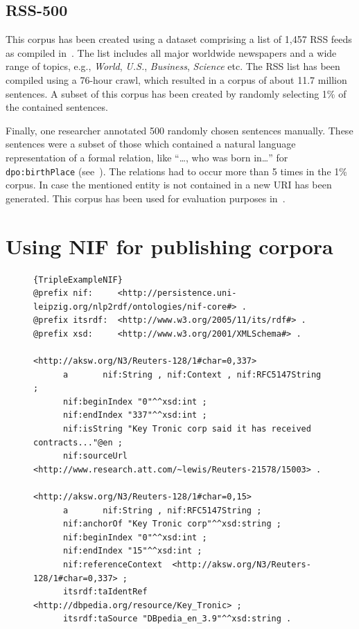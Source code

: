 \documentclass[10pt, a4paper]{article}
\begin{document}
\subsection{RSS-500}

This corpus has been created using a dataset comprising a list of 1,457 RSS feeds as compiled in~\cite{GOLDHAHN12.327}.
The list includes all major worldwide newspapers and a wide range of topics, e.g., \emph{World}, \emph{U.S.}, \emph{Business}, \emph{Science} etc.
The RSS list has been compiled using a 76-hour crawl, which resulted in a corpus of about 11.7 million sentences.
A subset of this corpus has been created by randomly selecting 1\% of the contained sentences.
 
Finally, one researcher annotated 500 randomly chosen sentences manually.
These sentences were a subset of those which contained a natural language representation of a formal relation, like ``\ldots, who was born in\ldots '' for \texttt{dpo:birthPlace} (see~\cite{conf/ekaw/GerberN12}).
The relations had to occur more than 5 times in the 1\% corpus. %
In case the mentioned entity is not contained in a new URI has been generated.
This corpus has been used for evaluation purposes in~\cite{GER+13}.

\section{Using NIF for publishing corpora}
\label{NIF}



\begin{figure}[t!]
\begin{lstlisting}[label=TripleExampleNIF,caption=example of the resulting N3-triples.]{TripleExampleNIF}
@prefix nif:     <http://persistence.uni-leipzig.org/nlp2rdf/ontologies/nif-core#> .
@prefix itsrdf:  <http://www.w3.org/2005/11/its/rdf#> .
@prefix xsd:     <http://www.w3.org/2001/XMLSchema#> .

<http://aksw.org/N3/Reuters-128/1#char=0,337>
      a       nif:String , nif:Context , nif:RFC5147String ;
      nif:beginIndex "0"^^xsd:int ;
      nif:endIndex "337"^^xsd:int ;
      nif:isString "Key Tronic corp said it has received contracts..."@en ;
      nif:sourceUrl <http://www.research.att.com/~lewis/Reuters-21578/15003> .

<http://aksw.org/N3/Reuters-128/1#char=0,15>
      a       nif:String , nif:RFC5147String ;
      nif:anchorOf "Key Tronic corp"^^xsd:string ;
      nif:beginIndex "0"^^xsd:int ;
      nif:endIndex "15"^^xsd:int ;
      nif:referenceContext  <http://aksw.org/N3/Reuters-128/1#char=0,337> ;
      itsrdf:taIdentRef <http://dbpedia.org/resource/Key_Tronic> ;
      itsrdf:taSource "DBpedia_en_3.9"^^xsd:string .
\end{lstlisting}
\end{figure}
\end{document}
